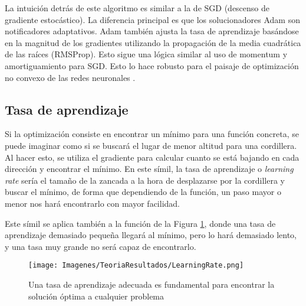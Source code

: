 \documentclass{report}
\begin{document}
La intuición detrás de este algoritmo es similar a la de SGD (descenso de gradiente estocástico). La diferencia principal es que los solucionadores Adam son notificadores adaptativos. Adam también ajusta la tasa de aprendizaje basándose en la magnitud de los gradientes utilizando la propagación de la media cuadrática de las raíces (RMSProp). Esto sigue una lógica similar al uso de momentum y amortiguamiento para SGD. Esto lo hace robusto para el paisaje de optimización no convexo de las redes neuronales \cite{RandomAdam}.




\subsection{Tasa de aprendizaje}\label{VariacionLearningRate}

Si la optimización consiste en encontrar un mínimo para una función concreta, se puede imaginar como si se buscará el lugar de menor altitud para una cordillera. Al hacer esto, se utiliza el gradiente para calcular cuanto se está bajando en cada dirección y encontrar el mínimo. En este símil, la tasa de aprendizaje o \textit{learning rate} sería el tamaño de la zancada a la hora de desplazarse por la cordillera y buscar el mínimo, de forma que dependiendo de la función, un paso mayor o menor nos hará encontrarlo con mayor facilidad.

Este símil se aplica también a la función de la Figura \ref{fig:TasaAprendizaje}, donde una tasa de aprendizaje demasiado pequeña llegará al mínimo, pero lo hará demasiado lento, y una tasa muy grande no será capaz de encontrarlo.

\hspace{0.4cm}
\begin{figure}[hbpt]
      \centering
	 \texttt{[image: Imagenes/TeoriaResultados/LearningRate.png]}
	 \caption{ Una tasa de aprendizaje adecuada es fundamental para encontrar la solución óptima a cualquier problema }
	 \label{fig:TasaAprendizaje}
\end{figure}
\hspace{0.4cm}
\end{document}
